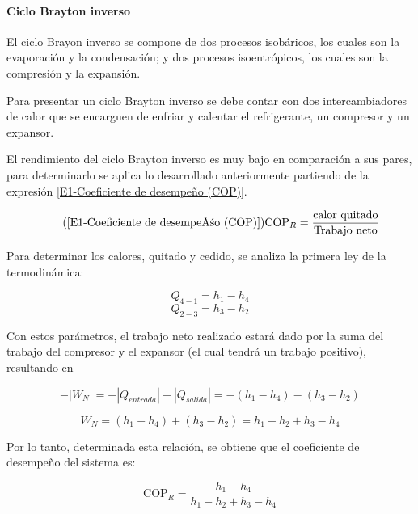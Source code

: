 	\paragraph{Ciclo Brayton inverso} El ciclo Brayon inverso se compone de dos procesos isobáricos, los cuales son la evaporación y la condensación; y dos procesos isoentrópicos, los cuales son la compresión y la expansión. 

	Para presentar un ciclo Brayton inverso se debe contar con dos intercambiadores de calor que se encarguen de enfriar y calentar el refrigerante, un compresor y un expansor. 

	El rendimiento del ciclo Brayton inverso es muy bajo en comparación a sus pares, para determinarlo se aplica lo desarrollado anteriormente partiendo de la expresión \eqref{E1-Coeficiente de desempeño (COP)}.

	\begin{equation}\tag{\ref{E1-Coeficiente de desempeño (COP)}}
		\text{COP}_R = \dfrac{\text{calor quitado}}{\text{Trabajo neto}}
	\end{equation}

	Para determinar los calores, quitado y cedido, se analiza la primera ley de la termodinámica:

	\begin{equation}\nonumber
		Q_{4-1} = h_1 - h_4
	\end{equation}
	\begin{equation}\nonumber
		Q_{2-3} = h_3 - h_2
	\end{equation}

	Con estos parámetros, el trabajo neto realizado estará dado por la suma del trabajo del compresor y el expansor (el cual tendrá un trabajo positivo), resultando en

	\begin{equation}\nonumber
		-\left|W_N\right| = -\left|Q_{entrada}\right| - \left|Q_{salida}\right| = - \left(h_1 - h_4\right) - \left(h_3 - h_2\right)
	\end{equation}

	\begin{equation}\nonumber
		W_N =  \left(h_1 - h_4\right) + \left(h_3 - h_2\right) = h_1 - h_2 + h_3 - h_4
	\end{equation}

	Por lo tanto, determinada esta relación, se obtiene que el coeficiente de desempeño del sistema es:

	\begin{equation}\label{E1-COP para un ciclo Brayton inverso}
		\text{COP}_R = \dfrac{h_1 - h_4}{h_1 - h_2 + h_3 - h_4}
	\end{equation}

